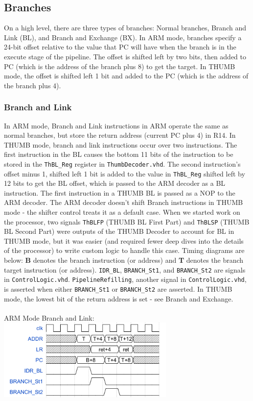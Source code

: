 \documentclass[11pt,a4paper]{article}
\begin{document}
	\subsection{Branches}
	On a high level, there are three types of branches: Normal branches, Branch and Link (BL), and Branch and Exchange (BX). In ARM mode, branches specify a 24-bit offset relative to the value that PC will have when the branch is in the execute stage of the pipeline. The offset is shifted left by two bits, then added to PC (which is the address of the branch plus 8) to get the target. In THUMB mode, the offset is shifted left 1 bit and added to the PC (which is the address of the branch plus 4).
	
	\subsubsection{Branch and Link}
	In ARM mode, Branch and Link instructions in ARM operate the same as normal branches, but store the return address (current PC plus 4) in R14. In THUMB mode, branch and link instructions occur over two instructions. The first instruction in the BL 
	causes the bottom 11 bits of the instruction to be stored in the \texttt{ThBL\_Reg} register in \texttt{ThumbDecoder.vhd}. The second instruction's offset minus 1, shifted left 1 bit is added to the value in \texttt{ThBL\_Reg} shifted left by 12 bits to get the BL offset, which is passed to the ARM decoder as a BL instruction. The first instruction in a THUMB BL is passed as a NOP to the ARM decoder. The ARM decoder doesn't shift Branch instructions in THUMB mode - the shifter control treats it as a default case. When we started work on the processor, two signals \texttt{ThBLFP} (THUMB BL First Part) and \texttt{ThBLSP} (THUMB BL Second Part) were outputs of the THUMB Decoder to account for BL in THUMB mode, but it was easier (and required fewer deep dives into the details of the processor) to write custom logic to handle this case. Timing diagrams are below: \textbf{B} denotes the branch instruction (or address) and \textbf{T} denotes the branch target instruction (or address). \texttt{IDR\_BL}, \texttt{BRANCH\_St1}, and \texttt{BRANCH\_St2} are signals in \texttt{ControlLogic.vhd}. \texttt{PipelineRefilling}, another signal in \texttt{ControlLogic.vhd}, is asserted when either \texttt{BRANCH\_St1} or \texttt{BRANCH\_St2} are asserted. In THUMB mode, the lowest bit of the return address is set - see Branch and Exchange.\\\\
	\newpage
	ARM Mode Branch and Link:\\
	\includegraphics[height=4cm, keepaspectratio=true]{armbl}\\
	
\end{document}
